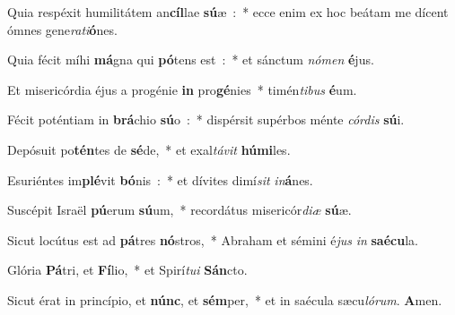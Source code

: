 \item Quia respéxit humilitátem an\textbf{cíl}lae \textbf{sú}æ~:~* ecce enim ex hoc beátam me dícent ómnes gene\emph{ra}\emph{ti}\textbf{ó}nes.
\item Quia fécit míhi \textbf{má}gna qui \textbf{pó}tens est~:~* et sánctum \emph{nó}\emph{men} \textbf{é}jus.
\item Et misericórdia éjus a progénie \textbf{in} pro\textbf{gé}nies~* timén\emph{ti}\emph{bus} \textbf{é}um.
\item Fécit poténtiam in \textbf{brá}chio \textbf{sú}o~:~* dispérsit supérbos ménte \emph{cór}\emph{dis} \textbf{sú}i.
\item Depósuit po\textbf{tén}tes de \textbf{sé}de,~* et exal\emph{tá}\emph{vit} \textbf{hú}\textbf{mi}les.
\item Esuriéntes im\textbf{plé}vit \textbf{bó}nis~:~* et dívites dimí\emph{sit} \emph{in}\textbf{á}nes.
\item Suscépit Israël \textbf{pú}erum \textbf{sú}um,~* recordátus misericór\emph{di}\emph{æ} \textbf{sú}æ.
\item Sicut locútus est ad \textbf{pá}tres \textbf{nó}stros,~* Abraham et sémini é\emph{jus} \emph{in} \textbf{saé}\textbf{cu}la.
\item Glória \textbf{Pá}tri, et \textbf{Fí}lio,~* et Spirí\emph{tu}\emph{i} \textbf{Sán}cto.
\item Sicut érat in princípio, et \textbf{núnc}, et \textbf{sém}per,~* et in saécula sæcu\emph{ló}\emph{rum}. \textbf{A}men.